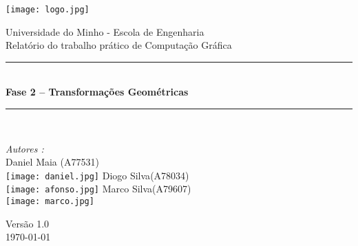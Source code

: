 \documentclass[a4paper]{article}
\begin{document}
\begin{titlepage}
\begin{center}


\texttt{[image: logo.jpg]}\\[0.5cm]

\vspace{10mm}

{\huge Universidade do Minho - Escola de Engenharia}\\[0.5cm]

{\large Relatório do trabalho prático de Computação Gráfica}\\[0.5cm]

\vspace{10mm} 

\rule{\linewidth}{0.5mm} \\[0.4cm]
{ \huge \bfseries Fase 2 – Transformações Geométricas \\[0.4cm] }
\rule{\linewidth}{0.5mm} \\[1.5cm]

\noindent
\begin{minipage}{0.4\textwidth}
  \begin{flushleft} \large
    \emph{Autores :}\\
    Daniel Maia \textsc{(A77531)}\\
    \texttt{[image: daniel.jpg]}\break
    Diogo Silva\textsc{(A78034)}\\
    \texttt{[image: afonso.jpg]}\break
    Marco Silva\textsc{(A79607)}\\
    \texttt{[image: marco.jpg]}\break
  \end{flushleft}
\end{minipage}%
\vfill

{\large Versão 1.0 \\ \today}

\end{center}
\end{titlepage}


\begin{abstract}%

\hspace{3mm} O objetivo desta fase do trabalho prático é criar cenas hierárquicas em XML recorrendo a transformações geométricas. Uma cena é definida por uma árvore cujos nodos contêm um conjunto de transformações geométricas, nomeadamente, \textit{translate, rotate} e \textit{scale}, e, opcionalmente, um conjunto de modelos. Cada poderá ter também um ou mais filhos. 

\par Para demonstrar o resultado do trabalho nesta fase, definir-se-á também uma cena com o modelo estático do sistema solar, com o Sol, os planetas e luas, definidos numa hierarquia.

\end{abstract}
\end{document}
